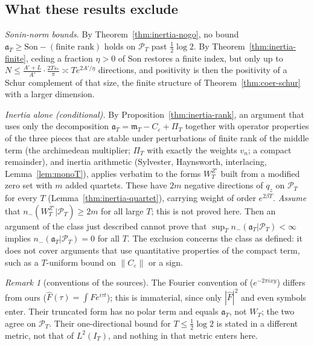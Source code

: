 \documentclass[11pt]{amsart}
\theoremstyle{definition}
\theoremstyle{remark}
\newtheorem{remark}[theorem]{Remark}
\newcommand{\PT}{\mathcal P_T}
\newcommand{\IT}{I_T}
\newcommand{\Fh}{\widehat F}
\newcommand{\PiT}{\Pi_T}
\newcommand{\mT}{\mathfrak m_T}
\begin{document}
\subsection{What these results exclude}\label{subsec:inertia-excl}
\emph{Sonin-norm bounds.} By Theorem~\ref{thm:inertia-nogo}, no bound $\mathfrak a_T\ge\mathrm{Son}-(\text{finite rank})$
holds on $\PT$ past $\frac12\log2$. By Theorem~\ref{thm:inertia-finite}, ceding a fraction $\eta>0$ of $\mathrm{Son}$
restores a finite index, but only up to $N\le\frac{A'+L}{A'}\cdot\frac{2Ts_*}\pi\asymp Te^{2A'/\eta}$ directions, and
positivity is then the positivity of a Schur complement of that size, the finite structure of
Theorem~\ref{thm:coer-schur} with a larger dimension.

\emph{Inertia alone (conditional).} By Proposition~\ref{thm:inertia-rank}, an argument that uses only the decomposition
$\mathfrak a_T=\mT-C_\varepsilon+\PiT$ together with operator properties of the three pieces that are stable under
perturbations of finite rank of the middle term (the archimedean multiplier; $\PiT$ with exactly the weights $v_n$;
a compact remainder), and inertia arithmetic (Sylvester, Haynsworth, interlacing, Lemma~\ref{lem:monoT}), applies
verbatim to the forms $W^{Z'}_T$ built from a modified zero set with $m$ added quartets. These have $2m$
negative directions of $q_z$ on $\PT$ for every $T$ (Lemma~\ref{thm:inertia-quartet}), carrying weight of order
$e^{2\beta T}$. \emph{Assume} that $n_-(W^{Z'}_T|\PT)\ge2m$ for all large $T$; this is not proved here. Then an argument
of the class just described cannot prove that $\sup_Tn_-(\mathfrak a_T|\PT)<\infty$ implies $n_-(\mathfrak a_T|\PT)=0$ for all
$T$. The exclusion concerns the class as defined: it does not cover arguments that use quantitative properties of
the compact term, such as a $T$-uniform bound on $\|C_\varepsilon\|$ or a sign.

\begin{remark}[conventions of the sources]\label{rem:inertia-conv}
The Fourier convention of \cite{ConnesConsani2021} ($e^{-2\pi ixy}$) differs from ours ($\Fh(\tau)=\int Fe^{i\tau t}$);
this is immaterial, since only $|\Fh|^2$ and even symbols enter. Their truncated form has no polar term and equals
$\mathfrak a_T$, not $W_T$; the two agree on $\PT$. Their one-directional bound for $T\le\frac12\log2$
\cite[\S5]{ConnesConsani2021} is stated in a different metric, not that of $L^2(\IT)$, and nothing in that metric
enters here.
\end{remark}
\end{document}
